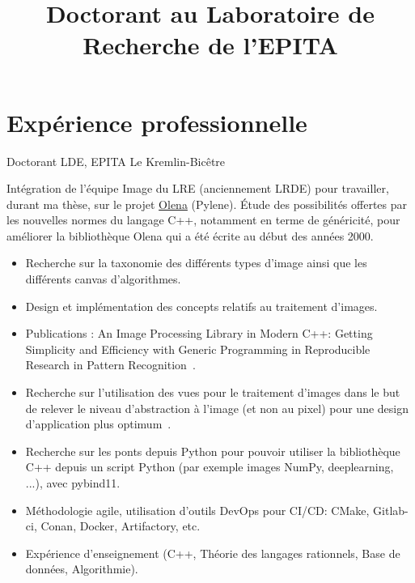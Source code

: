 \documentclass[11pt,a4paper,sans]{moderncv} %
\title{Doctorant au Laboratoire de Recherche de l’EPITA}
\begin{document}
\makecvtitle %


\section{Expérience professionnelle}

{Doctorant}
{LDE, EPITA}
{Le Kremlin-Bicêtre}
{}
{Intégration de l’équipe Image du LRE (anciennement LRDE) pour travailler, durant ma thèse, sur le projet \href{https://www.lre.epita.fr/wiki/Olena}{Olena} (Pylene). \'Etude des possibilités offertes par les nouvelles normes du langage C++, notamment en terme de généricité, pour améliorer la bibliothèque Olena qui a été écrite au début des années 2000.
\begin{itemize}
\item Recherche sur la taxonomie des différents types d'image ainsi que les différents canvas d'algorithmes.
\item Design et implémentation des concepts relatifs au traitement d'images.
\item Publications : An Image Processing Library in Modern C++: Getting Simplicity and Efficiency with Generic Programming in Reproducible Research in Pattern Recognition~\cite{roynard.2019.rrpr}.
\item Recherche sur l'utilisation des vues pour le traitement d'images dans le but de relever le niveau d'abstraction à l'image (et non au pixel) pour une design d'application plus optimum~\cite{roynard.2022.gpce}.
\item Recherche sur les ponts depuis Python pour pouvoir utiliser la bibliothèque C++ depuis un script Python (par exemple images NumPy, deeplearning, ...), avec pybind11.
\item Méthodologie agile, utilisation d'outils DevOps pour CI/CD: CMake, Gitlab-ci, Conan, Docker, Artifactory, etc.
\item Expérience d'enseignement (C++, Théorie des langages rationnels, Base de données, Algorithmie).
\end{itemize}
}
\end{document}
